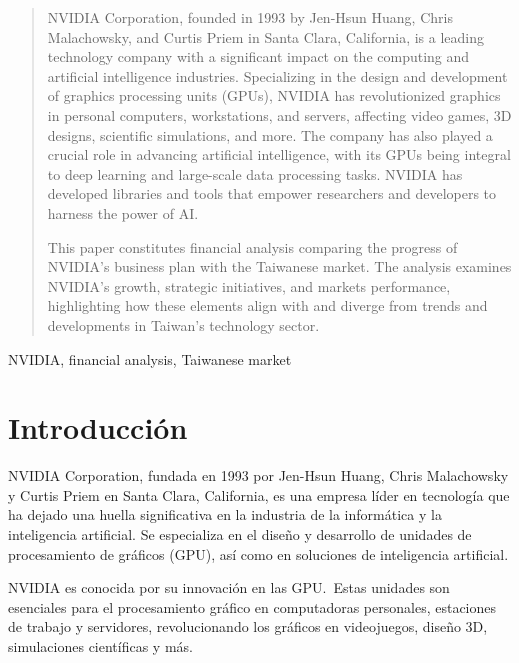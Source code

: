 \documentclass[conference]{IEEEtran}
\begin{document}
\begin{abstract}
	NVIDIA Corporation, founded in 1993 by Jen-Hsun Huang, Chris
	Malachowsky, and Curtis Priem in Santa Clara, California,
	is a leading technology company with a significant impact
	on the computing and artificial intelligence industries.
	Specializing in the design and development of graphics
	processing units (GPUs), NVIDIA has revolutionized graphics
	in personal computers, workstations, and servers, affecting
	video games, 3D designs, scientific simulations, and more. The
	company has also played a crucial role in advancing artificial
	intelligence, with its GPUs being integral to deep learning
	and large-scale data processing tasks. NVIDIA has developed
	libraries and tools that empower researchers and developers
	to harness the power of AI.\@{}

	This paper constitutes financial analysis comparing the
	progress of NVIDIA's business plan with the Taiwanese
	market. The analysis examines NVIDIA's growth, strategic
	initiatives, and markets performance, highlighting how
	these elements align with and diverge from trends and
	developments in Taiwan's technology sector.
\end{abstract}

\begin{IEEEkeywords}
	NVIDIA, financial analysis, Taiwanese market
\end{IEEEkeywords}

\nocite{cite_1}
\nocite{Amerise_2024}
\nocite{Efe_2023}
\nocite{Taiwan}
\nocite{BBCNewsMundo_2022}
\nocite{Chiang_2023}
\nocite{Martin}
\nocite{HistoriadeNVIDIA}
\nocite{NVIDIARevenue}
\nocite{NVIDIA_about_us}
\nocite{Millan_2023}
\nocite{Blanchard_2023}
\nocite{Bajpai}
\nocite{Morris_2019}
\nocite{Hollister_2023}
\nocite{McDowell_2024}

\section{Introducción}

NVIDIA Corporation, fundada en 1993 por Jen-Hsun Huang, Chris
Malachowsky y Curtis Priem en Santa Clara, California, es una
empresa líder en tecnología que ha dejado una huella
significativa en la industria de la informática y la
inteligencia artificial. Se especializa en el diseño y
desarrollo de unidades de procesamiento de gráficos (GPU),
así como en soluciones de inteligencia artificial.

NVIDIA es conocida por su innovación en las GPU.~Estas unidades
son esenciales para el procesamiento gráfico en computadoras
personales, estaciones de trabajo y servidores, revolucionando
los gráficos en videojuegos, diseño 3D, simulaciones científicas
y más.
\end{document}
